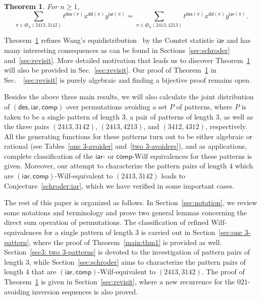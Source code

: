 \documentclass[12pt]{amsart}
\numberwithin{equation}{section}
\theoremstyle{plain}
\newtheorem{theorem}{Theorem}[section]
\theoremstyle{definition}
\def\des{\mathsf{des}}
\def\S{\mathfrak{S}}
\def\iar{\mathsf{iar}}
\def\comp{\mathsf{comp}}
\def\dd{\mathsf{dd}}
\begin{document}
\begin{theorem} \label{thm:sep}
For $n\geq1$,
\begin{equation}\label{eq:sep}
\sum_{\pi\in\S_n(2413,3142)}t^{\des(\pi)}x^{\dd(\pi)}y^{\iar(\pi)}=\sum_{\pi\in\S_n(2413,4213)}t^{\des(\pi)}x^{\dd(\pi)}y^{\iar(\pi)}.
\end{equation} 
\end{theorem}

Theorem~\ref{thm:sep} refines Wang's equidistribution~\cite[Thm.~1.5]{wan} by the Comtet statistic $\iar$ and has many interesting consequences as can be found in Sections~\ref{sec:schroder} and~\ref{sec:revisit}. More detailed motivation that leads us to discover Theorem~\ref{thm:sep} will also be provided  in Sec.~\ref{sec:revisit}. 
Our proof of Theorem~\ref{thm:sep} in Sec.~~\ref{sec:revisit} is purely algebraic and finding a bijective proof remains open. 

Besides the above three main results, we will also calculate the joint distribution of $(\des,\iar,\comp)$ over permutations avoiding a set $P$ of patterns, where $P$ is taken to be a single pattern of length $3$, a pair of patterns of length $3$, as well as the three pairs $(2413,3142)$, $(2413,4213)$, and $(3412,4312)$, respectively. All the generating functions for these patterns turn out to be either algebraic or rational (see Tables~\ref{one 3-avoider} and~\ref{two 3-avoiders}), and as applications, complete classification of the $\iar$- or $\comp$-Wilf equivalences for these patterns is given. Moreover, our attempt to characterize the pattern pairs of length $4$ which are $(\iar,\comp)$-Wilf-equivalent to $(2413,3142)$ leads to Conjecture~\ref{schroder:iar}, which we have verified in some important cases. 

The rest of this paper is organized as follows. In Section~\ref{sec:notation}, we review some notations and  terminology and prove two general lemmas concerning the direct sum operation of permutations. The classification of refined Wilf-equivalences for a single pattern of length $3$ is carried out in Section~\ref{sec:one 3-pattern}, where the proof of Theorem~\ref{main:thm1} is provided as well. Section~\ref{sec3: two 3-patterns} is devoted to the investigation of pattern pairs of length $3$, while Section~\ref{sec:schroder} aims to characterize the pattern pairs of length $4$ that are $(\iar,\comp)$-Wilf-equivalent to $(2413,3142)$. The proof of Theorem~\ref{thm:sep} is given in Section~\ref{sec:revisit}, where a new recurrence for the $021$-avoiding inversion sequences is also proved. 
\end{document}
